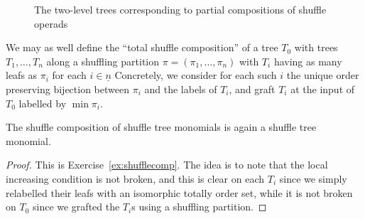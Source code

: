 \begin{figure}

\caption{The two-level trees corresponding
 to partial compositions of shuffle operads}
 \label{fig:twolevel}
\end{figure}
We may as well define the ``total shuffle
composition'' of a tree $T_0$ with trees
$T_1,\ldots,T_n$ along a shuffling partition
$\pi = (\pi_1,\ldots,\pi_n)$ with $T_i$ having
as many leafs as $\pi_i$ for each $i\in \underline{n}$
Concretely, we consider for each such $i$
the unique order preserving bijection
between $\pi_i$ and the labels of $T_i$,
and graft $T_i$ at the input of $T_0$
labelled by $\min \pi_i$. 

\begin{proposition}
The shuffle composition of shuffle tree
monomials is again a shuffle tree
monomial.
\end{proposition} 

\begin{proof}
This is Exercise~\ref{ex:shufflecomp}. The
idea is to note that the local increasing
condition is not broken, and this is clear
on each $T_i$ since we simply relabelled their
leafs with an isomorphic totally order
set, 
while it is not broken on
$T_0$ since we grafted the $T_i$s using
a shuffling partition.
\end{proof}

